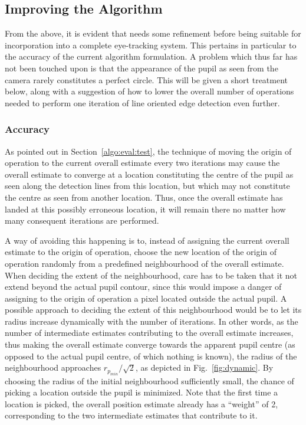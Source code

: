 \subsection{Improving the Algorithm}
\label{algo:eval:improve}

From the above, it is evident that {\octopus} needs some refinement
before being suitable for incorporation into a complete eye-tracking
system.  This pertains in particular to the accuracy of the current
algorithm formulation.  A problem which thus far has not been touched
upon is that the appearance of the pupil as seen from the camera
rarely constitutes a perfect circle.  This will be given a short
treatment below, along with a suggestion of how to lower the overall
number of operations needed to perform one iteration of line oriented
edge detection even further.

\subsubsection{Accuracy}

As pointed out in Section~\ref{algo:eval:test}, the technique of
moving the origin of operation to the current overall estimate every
two iterations may cause the overall estimate to converge at a
location constituting the centre of the pupil as seen along the
detection lines from this location, but which may not constitute the
centre as seen from another location.  Thus, once the overall
estimate has landed at this possibly erroneous location, it will
remain there no matter how many consequent iterations are performed.

A way of avoiding this happening is to, instead of assigning the
current overall estimate to the origin of operation, choose the new
location of the origin of operation randomly from a predefined
neighbourhood of the overall estimate.  When deciding the extent of
the neighbourhood, care has to be taken that it not extend beyond the
actual pupil contour, since this would impose a danger of assigning to
the origin of operation a pixel located outside the actual pupil.  A
possible approach to deciding the extent of this neighbourhood would
be to let its radius increase dynamically with the number of
iterations.  In other words, as the number of intermediate estimates
contributing to the overall estimate increases, thus making the
overall estimate converge towards the apparent pupil centre (as
opposed to the actual pupil centre, of which nothing is known), the
radius of the neighbourhood approaches $r_{p_{min}}/\sqrt{2}$, as
depicted in Fig.~\ref{fig:dynamic}.  By choosing the radius of the
initial neighbourhood sufficiently small, the chance of picking a
location outside the pupil is minimized.  Note that the first time a
location is picked, the overall position estimate already has a
``weight'' of 2, corresponding to the two intermediate estimates that
contribute to it.

